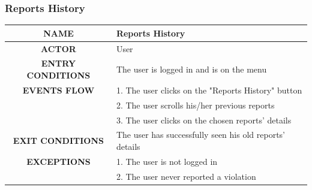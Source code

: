 \documentclass[12pt,a4paper]{article}
\begin{document}
\subsubsection{Reports History}
\begin{center}
			\begin{tabular}{| c | l |}
				\hline
				\textbf{NAME} & Reports History\\
				\hline
				\textbf{ACTOR} & User \\
				\hline
				\textbf{ENTRY CONDITIONS} & The user is logged in and is on the menu\\
				\hline
				\textbf{EVENTS FLOW}  &
				1. The user clicks on the "Reports History" button\\
				&2. The user scrolls his/her previous reports\\
				&3. The user clicks on the chosen reports' details\\
				\hline
				\textbf{EXIT CONDITIONS} & The user has successfully seen his old reports' details \\ 
				\hline
				\textbf{EXCEPTIONS} &
				1. The user is not logged in\\
				&2. The user never reported a violation\\
				\hline
			\end{tabular}
		\end{center}
\end{document}
